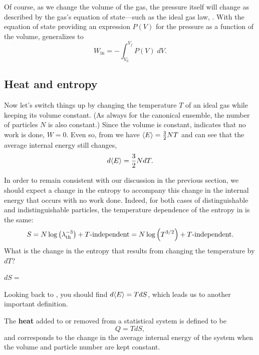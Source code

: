 Of course, as we change the volume of the gas, the pressure itself will change as described by the gas's equation of state---such as the ideal gas law, .
With the equation of state providing an expression $P(V)$ for the pressure as a function of the volume,  generalizes to
\begin{equation}
  \label{eq:work}
  W_{\text{in}} = -\int_{V_0}^{V_f} P(V) \; dV.
\end{equation}



\subsection{Heat and entropy}
Now let's switch things up by changing the temperature $T$ of an ideal gas while keeping its volume constant.
(As always for the canonical ensemble, the number of particles $N$ is also constant.)
Since the volume is constant,  indicates that no work is done, $W = 0$.
Even so, from  we have $\left\langle E \right\rangle = \frac{3}{2} NT$ and can see that the average internal energy still changes,
\begin{equation}
  \label{eq:dE_dT}
  d\!\left\langle E \right\rangle = \frac{3}{2} N dT.
\end{equation}

In order to remain consistent with our discussion in the previous section, we should expect a change in the entropy to accompany this change in the internal energy that occurs with no work done.
Indeed, for both cases of distinguishable and indistinguishable particles, the temperature dependence of the entropy in  is the same:
\begin{equation*}
  S = N\log\left(\lambda_{\mathrm{th}}^{-3}\right) + T\mbox{-independent} = N\log\left(T^{3 / 2}\right) + T\mbox{-independent}.
\end{equation*}
What is the change in the entropy that results from changing the temperature by $dT$?
\begin{mdframed}
  $\displaystyle dS = $ \\[60 pt]
\end{mdframed}
Looking back to , you should find $d\!\left\langle E \right\rangle = T dS$, which leads us to another important definition.

\begin{shaded}
  The \textbf{heat} added to or removed from a statistical system is defined to be
  \begin{equation}
    \label{eq:heat_def}
    Q = T dS,
  \end{equation}
  and corresponds to the change in the average internal energy of the system when the volume and particle number are kept constant.
\end{shaded}

